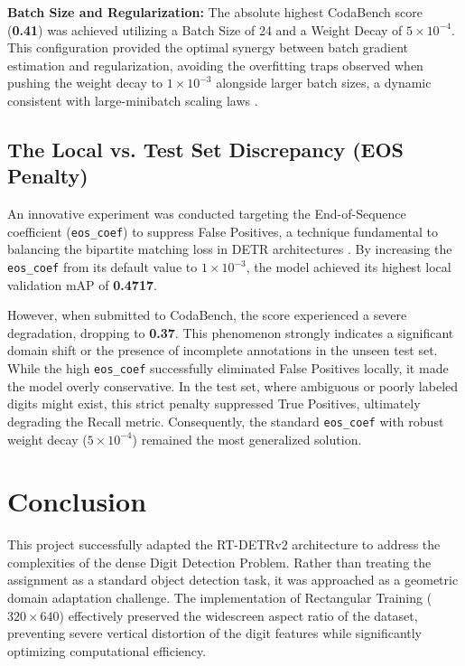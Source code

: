 \documentclass[12pt, a4paper]{article}
\begin{document}
\textbf{Batch Size and Regularization:} The absolute highest CodaBench score (\textbf{0.41}) was achieved utilizing a Batch Size of 24 and a Weight Decay of $5 \times 10^{-4}$. This configuration provided the optimal synergy between batch gradient estimation and regularization, avoiding the overfitting traps observed when pushing the weight decay to $1 \times 10^{-3}$ alongside larger batch sizes, a dynamic consistent with large-minibatch scaling laws \cite{goyal2017}.

\subsection{The Local vs. Test Set Discrepancy (EOS Penalty)}
An innovative experiment was conducted targeting the End-of-Sequence coefficient (\texttt{eos\_coef}) to suppress False Positives, a technique fundamental to balancing the bipartite matching loss in DETR architectures \cite{carion2020}. By increasing the \texttt{eos\_coef} from its default value to $1 \times 10^{-3}$, the model achieved its highest local validation mAP of \textbf{0.4717}.

However, when submitted to CodaBench, the score experienced a severe degradation, dropping to \textbf{0.37}. This phenomenon strongly indicates a significant domain shift or the presence of incomplete annotations in the unseen test set. While the high \texttt{eos\_coef} successfully eliminated False Positives locally, it made the model overly conservative. In the test set, where ambiguous or poorly labeled digits might exist, this strict penalty suppressed True Positives, ultimately degrading the Recall metric. Consequently, the standard \texttt{eos\_coef} with robust weight decay ($5 \times 10^{-4}$) remained the most generalized solution.

\section{Conclusion}

This project successfully adapted the RT-DETRv2 architecture to address the complexities of the dense Digit Detection Problem. Rather than treating the assignment as a standard object detection task, it was approached as a geometric domain adaptation challenge. The implementation of Rectangular Training ($320 \times 640$) effectively preserved the widescreen aspect ratio of the dataset, preventing severe vertical distortion of the digit features while significantly optimizing computational efficiency.
\end{document}
